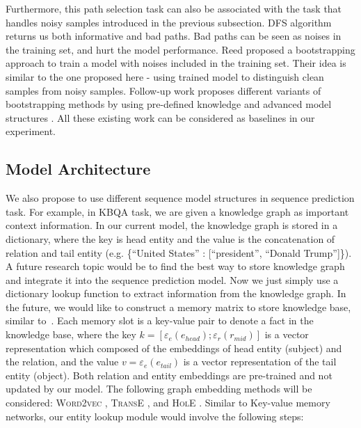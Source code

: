 Furthermore, this path selection task can also be associated with the task that handles noisy samples introduced in the previous subsection. DFS algorithm returns us both informative and bad paths. Bad paths can be seen as noises in the training set, and hurt the model performance. Reed \cite{reed2014training2} proposed a bootstrapping approach to train a model with noises included in the training set. Their idea is similar to the one proposed here - using trained model to distinguish clean samples from noisy samples. Follow-up work proposes different variants of bootstrapping methods by using pre-defined knowledge and advanced model structures \cite{tanaka2018joint,yi2019probabilistic,han2019deep}. All these existing work can be considered as baselines in our experiment.


\subsection{Model Architecture} \label{future_model}

We also propose to use different sequence model structures in sequence prediction task. For example, in KBQA task, we are given a knowledge graph as important context information. In our current model, the knowledge graph is stored in a dictionary, where the key is head entity and the value is the concatenation of relation and tail entity (e.g. \{``United States'' : [``president'', ``Donald Trump'']\}). A future research topic would be to find the best way to store knowledge graph and integrate it into the sequence prediction model. Now we just simply use a dictionary lookup function to extract information from the knowledge graph. In the future, we would like to construct a memory matrix to store knowledge base, similar to~\cite{DBLP:conf/emnlp/MillerFDKBW16}. Each memory slot is a key-value pair to denote a fact in the knowledge base, where the key $k=[\varepsilon_e(e_{head});\varepsilon_r(r_{mid})]$ is a vector representation which composed of the embeddings of head entity (subject) and the relation, and the value $v=\varepsilon_e(e_{tail})$ is a vector representation of the tail entity (object). Both relation and entity embeddings are pre-trained and not updated by our model. The following graph embedding methods will be considered: \textsc{Word2vec} \cite{DBLP:journals/corr/abs-1301-3781}, \textsc{TransE} \cite{DBLP:conf/nips/BordesUGWY13}, and \textsc{HolE} \cite{DBLP:journals/corr/TrouillonN17}. Similar to Key-value memory networks, our entity lookup module would involve the following steps: 

